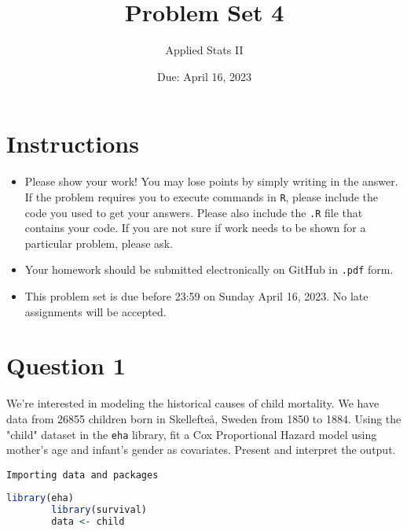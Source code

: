 \documentclass[12pt,letterpaper]{article}
\title{Problem Set 4}
\date{Due: April 16, 2023}
\author{Applied Stats II}
\begin{document}
	\maketitle
	\section*{Instructions}
	\begin{itemize}
		\item Please show your work! You may lose points by simply writing in the answer. If the problem requires you to execute commands in \texttt{R}, please include the code you used to get your answers. Please also include the \texttt{.R} file that contains your code. If you are not sure if work needs to be shown for a particular problem, please ask.
		\item Your homework should be submitted electronically on GitHub in \texttt{.pdf} form.
		\item This problem set is due before 23:59 on Sunday April 16, 2023. No late assignments will be accepted.
		
	\end{itemize}
	
	\vspace{.25cm}
	\section*{Question 1}
	\vspace{.25cm}
	\noindent We're interested in modeling the historical causes of child mortality. We have data from 26855 children born in Skellefteå, Sweden from 1850 to 1884. Using the "child" dataset in the \texttt{eha} library, fit a Cox Proportional Hazard model using mother's age and infant's gender as covariates. Present and interpret the output.
	
	\newpage
    \texttt{Importing data and packages}
    \begin{lstlisting}[language=R]
    	library(eha)
    	library(survival)
    	data <- child
    \end{lstlisting}
\end{document}
